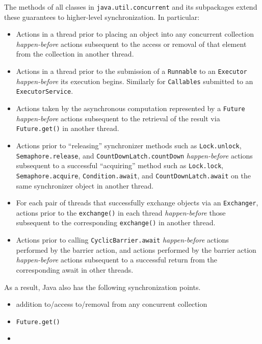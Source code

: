 \documentclass[
a4paper,
12pt,
]{report}
\newcommand{\java}{Java\texttrademark\xspace}
\begin{document}
\begin{quoting}
  The methods of all classes in \texttt{java.util.concurrent} and its
  subpackages extend these guarantees to higher-level
  synchronization. In particular:
  \begin{itemize}
  \item Actions in a thread prior to placing an object into any
    concurrent collection \textit{happen-before} actions subsequent to
    the access or removal of that element from the collection in
    another thread.
  \item Actions in a thread prior to the submission of a
    \texttt{Runnable} to an \texttt{Executor} \textit{happen-before}
    its execution begins. Similarly for \texttt{Callables} submitted
    to an \texttt{ExecutorService}.
  \item Actions taken by the asynchronous computation represented by a
    \texttt{Future} \textit{happen-before} actions subsequent to the
    retrieval of the result via \texttt{Future.get()} in another
    thread.
  \item Actions prior to ``releasing'' synchronizer methods such as
    \texttt{Lock.unlock}, \texttt{Semaphore.release}, and
    \texttt{CountDownLatch.countDown} \textit{happen-before} actions
    subsequent to a successful ``acquiring'' method such as
    \texttt{Lock.lock}, \texttt{Semaphore.acquire},
    \texttt{Condition.await}, and \texttt{CountDownLatch.await} on the
    same synchronizer object in another thread.
  \item For each pair of threads that successfully exchange objects
    via an \texttt{Exchanger}, actions prior to the
    \texttt{exchange()} in each thread \textit{happen-before} those
    subsequent to the corresponding \texttt{exchange()} in another
    thread.
  \item Actions prior to calling \texttt{CyclicBarrier.await}
    \textit{happen-before} actions performed by the barrier action,
    and actions performed by the barrier action \textit{happen-before}
    actions subsequent to a successful return from the corresponding
    await in other threads.
  \end{itemize}
\end{quoting}

As a result, \java also has the following synchronization points.
\begin{itemize}
\item addition to/access to/removal from any concurrent collection
\item \verb!Future.get()!
\item
\end{itemize}
\end{document}
